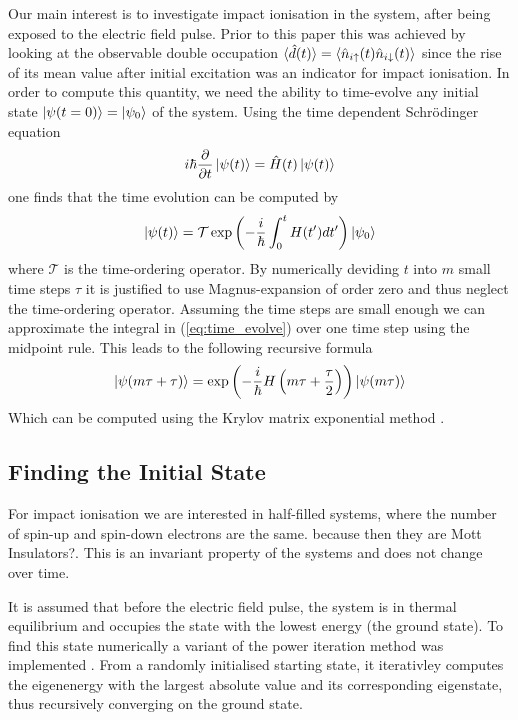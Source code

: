 Our main interest is to investigate impact ionisation in the system, after being exposed to the electric field pulse. Prior to this paper this was achieved by looking at the observable double occupation $\braket{\hat{d}(t)} = \braket{\hat{n}_{i\uparrow}(t) \hat{n}_{i\downarrow}(t)}$ since the rise of its mean value after initial excitation was an indicator for impact ionisation. In order to compute this quantity, we need the ability to time-evolve any initial state $\ket{\psi(t=0)} = \ket{\psi_0}$ of the system. Using the time dependent Schrödinger equation
\begin{equation}
    i\hbar \frac{\partial}{\partial t}\ket{\psi(t)} = \hat{H}(t)\ket{\psi(t)}\label{eq:time_evolve}
\end{equation}
one finds that the time evolution can be computed by
\begin{equation}
    \ket{\psi (t)} = \mathcal{T} \exp\left(-\frac{i}{\hbar}\int_0^t H(t') dt'\right) \ket{\psi_0}
\end{equation}
where $\mathcal{T}$ is the time-ordering operator. By numerically deviding $t$ into $m$ small time steps $\tau$ it is justified to use Magnus-expansion \cite{magnus} of order zero and thus neglect the time-ordering operator. Assuming the time steps are small enough we can approximate the integral in (\ref{eq:time_evolve}) over one time step using the midpoint rule. This leads to the following recursive formula
\begin{equation}
    \ket{\psi(m\tau + \tau)} = \exp\left(-\frac{i}{\hbar} H\left(m\tau + \frac{\tau}{2}\right)\right)\ket{\psi(m\tau)}
\end{equation}
Which can be computed using the Krylov matrix exponential method \cite{innerberger}.

\subsection{Finding the Initial State}
For impact ionisation we are interested in half-filled systems, where the number of spin-up and spin-down electrons are the same. {\color{red} because then they are Mott Insulators?}. This is an invariant property of the systems and does not change over time.
\medskip

It is assumed that before the electric field pulse, the system is in thermal equilibrium and occupies the state with the lowest energy (the ground state). To find this state numerically a variant of the power iteration method was implemented \cite{innerberger}. From a randomly initialised starting state, it iterativley computes the eigenenergy with the largest absolute value and its corresponding eigenstate, thus recursively converging on the ground state.

